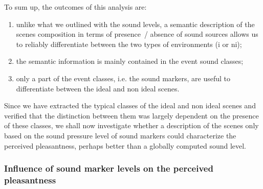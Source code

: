 \documentclass[12pt]{elsarticle}
\begin{document}
To sum up, the outcomes of this analysis are:

\begin{enumerate}
\item unlike what we outlined with the sound levels, a semantic description of the scenes composition in terms of presence~/ absence of sound sources allows us to reliably differentiate between the two types of environments (i or ni);
\item the semantic information is mainly contained in the event sound classes;
\item only a part of the event classes, i.e. the sound markers, are useful to differentiate between the ideal and non ideal scenes.
\end{enumerate}


Since we have extracted the typical classes of the ideal and non ideal scenes and verified that the distinction between them was largely dependent on the presence of these classes, we shall now investigate whether a description of the scenes only based on the sound pressure level of sound markers could characterize the perceived pleasantness, perhaps better than a globally computed sound level.

\subsubsection*{Influence of sound marker levels on the perceived pleasantness}
\end{document}
